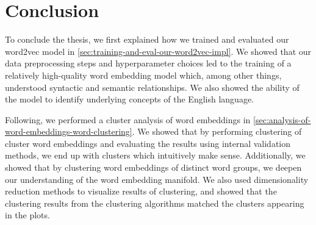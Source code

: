 \section{Conclusion}
\label{sec:conclusion}
To conclude the thesis, we first explained how we trained and evaluated our word2vec model in \cref{sec:training-and-eval-our-word2vec-impl}. We showed that our data preprocessing steps and hyperparameter choices led to the training of a relatively high-quality word embedding model which, among other things, understood syntactic and semantic relationships. We also showed the ability of the model to identify underlying concepts of the English language.

Following, we performed a cluster analysis of word embeddings in \cref{sec:analysis-of-word-embeddings-word-clustering}. We showed that by performing clustering of cluster word embeddings and evaluating the results using internal validation methods, we end up with clusters which intuitively make sense. Additionally, we showed that by clustering word  embeddings of distinct word groups, we deepen our understanding of the word embedding manifold. We also used dimensionality reduction methods to visualize results of clustering, and showed that the clustering results from the clustering algorithms matched the clusters appearing in the plots.


